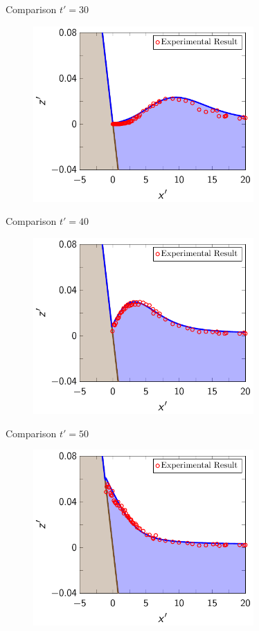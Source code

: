\documentclass[pdf]{beamer}
\begin{document}
\begin{frame}{Comparison $t'=30$}
		\begin{figure}
			\includegraphics[width=0.75\textwidth]{./Pics/Synolakis/t=30s.pdf}
		\end{figure}
\end{frame}

\begin{frame}{Comparison $t'=40$}
	\begin{figure}
		\includegraphics[width=0.75\textwidth]{./Pics/Synolakis/t=40s.pdf}
	\end{figure}
\end{frame}

\begin{frame}{Comparison $t'=50$}
	\begin{figure}
		\includegraphics[width=0.75\textwidth]{./Pics/Synolakis/t=50s.pdf}
	\end{figure}
\end{frame}
\end{document}
